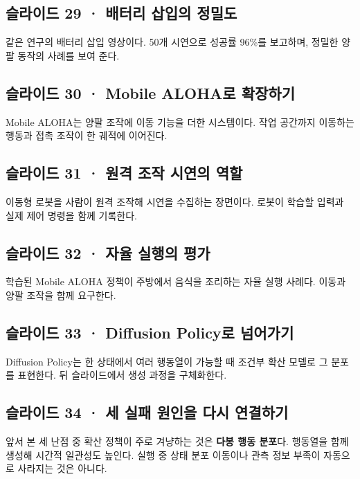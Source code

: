 \documentclass[11pt,a4paper]{article}
\begin{document}
\subsection{슬라이드 29 · 배터리 삽입의 정밀도}

같은 연구의 배터리 삽입 영상이다. 50개 시연으로 성공률 96\%를 보고하며, 정밀한 양팔 동작의 사례를 보여 준다.\par

\subsection{슬라이드 30 · Mobile ALOHA로 확장하기}

Mobile ALOHA는 양팔 조작에 이동 기능을 더한 시스템이다. 작업 공간까지 이동하는 행동과 접촉 조작이 한 궤적에 이어진다.\par

\subsection{슬라이드 31 · 원격 조작 시연의 역할}

이동형 로봇을 사람이 원격 조작해 시연을 수집하는 장면이다. 로봇이 학습할 입력과 실제 제어 명령을 함께 기록한다.\par

\subsection{슬라이드 32 · 자율 실행의 평가}

학습된 Mobile ALOHA 정책이 주방에서 음식을 조리하는 자율 실행 사례다. 이동과 양팔 조작을 함께 요구한다.\par

\subsection{슬라이드 33 · Diffusion Policy로 넘어가기}

Diffusion Policy는 한 상태에서 여러 행동열이 가능할 때 조건부 확산 모델로 그 분포를 표현한다. 뒤 슬라이드에서 생성 과정을 구체화한다.\par

\subsection{슬라이드 34 · 세 실패 원인을 다시 연결하기}

앞서 본 세 난점 중 확산 정책이 주로 겨냥하는 것은 \textbf{다봉 행동 분포}다. 행동열을 함께 생성해 시간적 일관성도 높인다. 실행 중 상태 분포 이동이나 관측 정보 부족이 자동으로 사라지는 것은 아니다.\par
\end{document}
